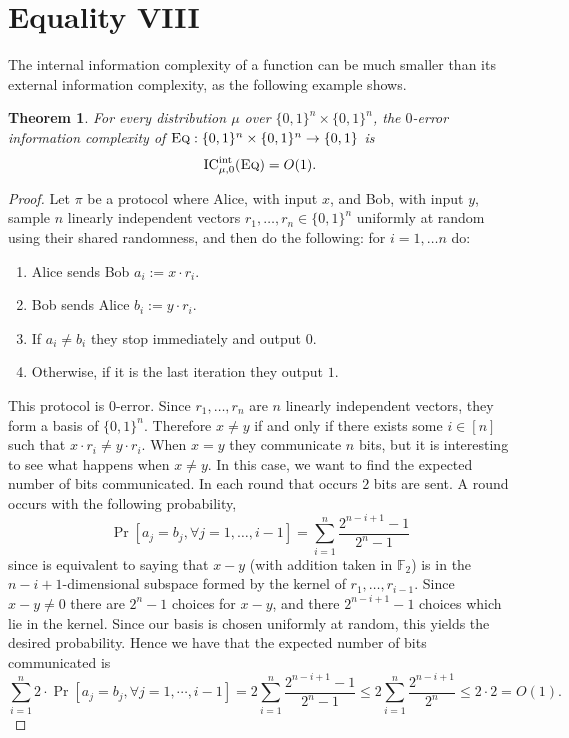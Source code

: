\documentclass[11pt]{amsart}
\theoremstyle{plain}
\newtheorem{theorem}{Theorem}
\theoremstyle{definition}
\theoremstyle{plain}
\newcommand{\Eq}{\textsc{Eq}}
\newcommand{\ICint}{\mathrm{IC}^{\mathrm{int}}}
\begin{document}
\newpage 
\section{Equality VIII}

The internal information complexity of a function can be much smaller than its external information complexity, as the following example shows.

\begin{theorem}
For every distribution $\mu$ over $\{0,1\}^n \times \{0,1\}^n$, the $0$-error information complexity of $\Eq : \{0,1\}^n \times \{0,1\}^n \to \{0,1\}$ is 
\[
\ICint_{\mu,0}(\Eq) = O(1).
\]
\end{theorem}

\begin{proof}
Let $\pi$ be a protocol where Alice, with input $x$, and Bob, with input $y$, sample $n$ linearly independent vectors $r_1, \dots, r_n \in \{0,1\}^n$ uniformly at random using their shared randomness, and then do the following: for $i=1,\dots n$ do:
\begin{enumerate}
	\item Alice sends Bob $a_i:=x\cdot r_i$.
	\item Bob sends Alice $b_i:=y\cdot r_i$.
	\item If $a_i \neq b_i$ they stop immediately and output $0$.
	\item Otherwise, if it is the last iteration they output $1$.
\end{enumerate} 
This protocol is $0$-error. Since $r_1,\dots, r_n$ are $n$ linearly independent vectors, they form a basis of $\{0,1\}^n$. Therefore $x\neq y$ if and only if there exists some $i\in[n]$ such that $x\cdot r_i \neq y\cdot r_i$. When $x=y$ they communicate $n$ bits, but it is interesting to see what happens when $x\neq y$. In this case, we want to find the expected number of bits communicated. In each round that occurs $2$ bits are sent. A round occurs with the following probability,
$$\Pr[a_j = b_j, \forall j=1,\dots, i-1]=\sum_{i=1}^n\frac{2^{n-i+1}-1}{2^n-1}$$
since is equivalent to saying that $x-y$ (with addition taken in $\mathbb{F}_2$) is in the $n-i+1$-dimensional subspace formed by the kernel of $r_1,\dots,r_{i-1}$. Since $x-y\neq 0$ there are $2^n-1$ choices for $x-y$, and there $2^{n-i+1}-1$ choices which lie in the kernel. Since our basis is chosen uniformly at random, this yields the desired probability. Hence we have that the expected number of bits communicated is
$$\sum_{i=1}^n 2\cdot\Pr[a_j = b_j, \forall j=1,\cdots, i-1] = 2\sum_{i=1}^n\frac{2^{n-i+1}-1}{2^n-1}\leq 2\sum_{i=1}^n\frac{2^{n-i+1}}{2^n} \leq 2\cdot 2 = O(1).$$

\end{proof}
\end{document}
